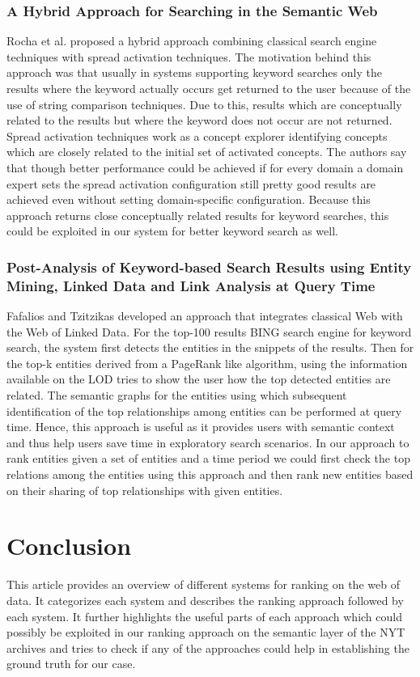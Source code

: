 \documentclass{article}
\begin{document}
     \subsubsection{A Hybrid Approach for Searching in the Semantic Web}
     Rocha et al.\cite{rocha04} proposed a hybrid approach combining classical search engine techniques with spread activation techniques. The motivation behind this approach was that usually in systems supporting keyword searches only the results where the keyword actually occurs get returned to the user because of the use of  string comparison techniques. Due to this, results which are conceptually related to the results but where the keyword does not occur are not returned. Spread activation techniques work as a concept explorer identifying concepts which are closely related to the initial set of activated concepts. The authors say that though better performance could be achieved if for every domain a domain expert sets the spread activation configuration still pretty good results are achieved even without setting domain-specific configuration. Because this approach returns close conceptually related results for keyword searches, this could be exploited in our system for better keyword search as well.

     \subsubsection{Post-Analysis of Keyword-based Search Results using Entity Mining, Linked Data and Link Analysis at Query Time}
     Fafalios and Tzitzikas\cite{fafalios14} developed an approach that integrates classical Web with the Web of Linked Data. For the top-100 results BING search engine for keyword search, the system first detects the entities in the snippets of the results. Then for the top-k entities derived from a PageRank like algorithm, using the information available on the LOD tries to show the user how the top detected entities are related. The semantic graphs for the entities using which subsequent identification of the top relationships among entities can be performed at query time. Hence, this approach is useful as it provides users with semantic context and thus help users save time in exploratory search scenarios. In our approach to rank entities given a set of entities and a time period we could first check the top relations among the entities using this approach and then rank new entities based on their sharing of top relationships with given entities.


     \section{Conclusion}
     This article provides an overview of different systems for ranking on the web of data. It categorizes each system and describes the ranking approach followed by each system. It further highlights the useful parts of each approach which could possibly be exploited in our ranking approach on the semantic layer of the NYT archives and tries to check if any of the approaches could help in establishing the ground truth for our case.
\end{document}
